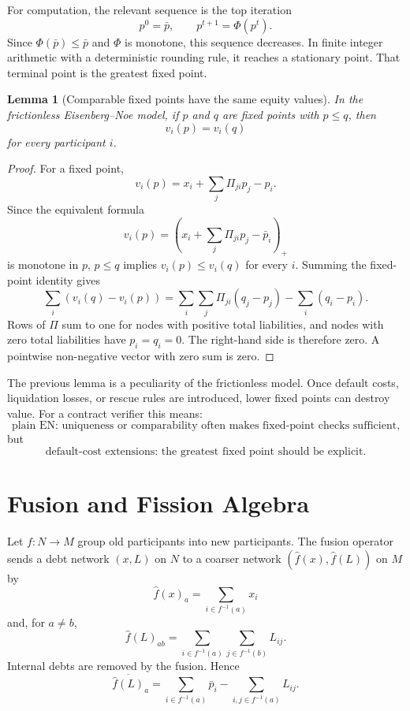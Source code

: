 \documentclass[11pt,oneside]{article}
\newtheorem{lemma}{Lemma}
\newcommand{\barp}{\bar p}
\begin{document}
For computation, the relevant sequence is the top iteration
\[
  p^0=\barp,\qquad p^{t+1}=\Phi(p^t).
\]
Since $\Phi(\barp)\leq\barp$ and $\Phi$ is monotone, this sequence decreases.
In finite integer arithmetic with a deterministic rounding rule, it reaches a
stationary point. That terminal point is the greatest fixed point.

\begin{lemma}[Comparable fixed points have the same equity values]
In the frictionless Eisenberg--Noe model, if $p$ and $q$ are fixed points with
$p\leq q$, then
\[
  v_i(p)=v_i(q)
\]
for every participant $i$.
\end{lemma}

\begin{proof}
For a fixed point,
\[
  v_i(p)=x_i+\sum_j\Pi_{ji}p_j-p_i.
\]
Since the equivalent formula
\[
  v_i(p)=\left(x_i+\sum_j\Pi_{ji}p_j-\barp_i\right)_+
\]
is monotone in $p$, $p\leq q$ implies $v_i(p)\leq v_i(q)$ for every $i$.
Summing the fixed-point identity gives
\[
  \sum_i(v_i(q)-v_i(p))
  =
  \sum_i\sum_j\Pi_{ji}(q_j-p_j)-\sum_i(q_i-p_i).
\]
Rows of $\Pi$ sum to one for nodes with positive total liabilities, and nodes
with zero total liabilities have $p_i=q_i=0$. The right-hand side is therefore
zero. A pointwise non-negative vector with zero sum is zero.
\end{proof}

The previous lemma is a peculiarity of the frictionless model. Once default
costs, liquidation losses, or rescue rules are introduced, lower fixed points
can destroy value. For a contract verifier this means:
\[
  \text{plain EN: uniqueness or comparability often makes fixed-point checks
  sufficient,}
\]
but
\[
  \text{default-cost extensions: the greatest fixed point should be explicit.}
\]

\section{Fusion and Fission Algebra}

Let $f:N\to M$ group old participants into new participants. The fusion
operator sends a debt network $(x,L)$ on $N$ to a coarser network
$(\widehat f(x),\widehat f(L))$ on $M$ by
\[
  \widehat f(x)_a=\sum_{i\in f^{-1}(a)}x_i
\]
and, for $a\neq b$,
\[
  \widehat f(L)_{ab}
  =
  \sum_{i\in f^{-1}(a)}
  \sum_{j\in f^{-1}(b)}L_{ij}.
\]
Internal debts are removed by the fusion. Hence
\[
  \overline{\widehat f(L)}_a
  =
  \sum_{i\in f^{-1}(a)}\barp_i
  -
  \sum_{i,j\in f^{-1}(a)}L_{ij}.
\]
\end{document}
